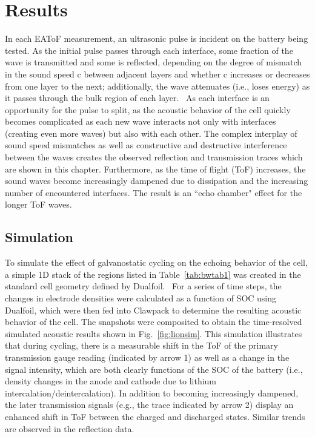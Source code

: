 \section{Results}
\label{sec:bw:results}

In each EAToF measurement, an ultrasonic pulse is incident on the battery being tested. As the initial pulse passes through each interface, some fraction of the wave is transmitted and some is reflected, depending on the degree of mismatch in the sound speed c between adjacent layers and whether c increases or decreases from one layer to the next; additionally, the wave attenuates (i.e., loses energy) as it passes through the bulk region of each layer.~\cite{Cheeke2012-wp} As each interface is an opportunity for the pulse to split, as the acoustic behavior of the cell quickly becomes complicated as each new wave interacts not only with interfaces (creating even more waves) but also with each other. The complex interplay of sound speed mismatches as well as constructive and destructive interference between the waves creates the observed reflection and transmission traces which are shown in this chapter. Furthermore, as the time of flight (ToF) increases, the sound waves become increasingly dampened due to dissipation and the increasing number of encountered interfaces. The result is an “echo chamber" effect for the longer ToF waves.

\subsection{Simulation}
To simulate the effect of galvanostatic cycling on the echoing behavior of the cell, a simple 1D stack of the regions listed in Table~\ref{tab:bwtab1} was created in the standard cell geometry defined by Dualfoil.~\cite{Albertus2007-eu} For a series of time steps, the changes in electrode densities were calculated as a function of SOC using Dualfoil, which were then fed into Clawpack to determine the resulting acoustic behavior of the cell. The snapshots were composited to obtain the time-resolved simulated acoustic results shown in Fig.~\ref{fig:lionsim}. This simulation illustrates that during cycling, there is a measurable shift in the ToF of the primary transmission gauge reading (indicated by arrow 1) as well as a change in the signal intensity, which are both clearly functions of the SOC of the battery (i.e., density changes in the anode and cathode due to lithium intercalation/deintercalation). In addition to becoming increasingly dampened, the later transmission signals (e.g., the trace indicated by arrow 2) display an enhanced shift in ToF between the charged and discharged states. Similar trends are observed in the reflection data.

